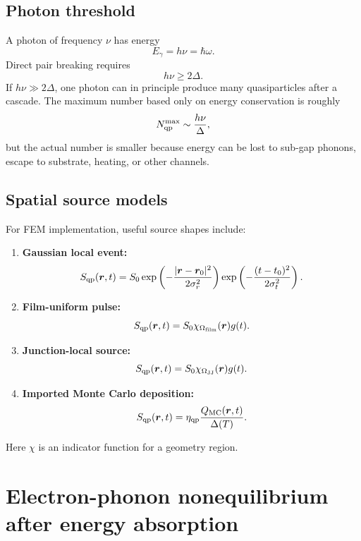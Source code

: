 \documentclass[11pt]{article}
\newcommand{\br}{{\bm{r}}}
\newcommand{\JJvol}{\Omega_{\mathrm{JJ}}}
\newcommand{\film}{\Omega_{\mathrm{film}}}
\begin{document}
\subsection{Photon threshold}
A photon of frequency $\nu$ has energy
\begin{equation}
E_\gamma=h\nu=\hbar\omega.
\end{equation}
Direct pair breaking requires
\begin{equation}
 h\nu\ge2\Delta.
\end{equation}
If $h\nu\gg2\Delta$, one photon can in principle produce many quasiparticles after a cascade. The maximum number based only on energy conservation is roughly
\begin{equation}
 N_{\mathrm{qp}}^{\max}\sim\frac{h\nu}{\Delta},
\end{equation}
but the actual number is smaller because energy can be lost to sub-gap phonons, escape to substrate, heating, or other channels.

\subsection{Spatial source models}
For FEM implementation, useful source shapes include:
\begin{enumerate}[leftmargin=1.6em]
    \item \textbf{Gaussian local event:}
    \begin{equation}
    S_{\qp}(\br,t)=S_0\exp\left(-\frac{|\br-\br_0|^2}{2\sigma_r^2}\right)
    \exp\left(-\frac{(t-t_0)^2}{2\sigma_t^2}\right).
    \end{equation}
    \item \textbf{Film-uniform pulse:}
    \begin{equation}
    S_{\qp}(\br,t)=S_0\chi_{\film}(\br)g(t).
    \end{equation}
    \item \textbf{Junction-local source:}
    \begin{equation}
    S_{\qp}(\br,t)=S_0\chi_{\JJvol}(\br)g(t).
    \end{equation}
    \item \textbf{Imported Monte Carlo deposition:}
    \begin{equation}
    S_{\qp}(\br,t)=\eta_{\qp}\frac{Q_{\mathrm{MC}}(\br,t)}{\Delta(T)}.
    \end{equation}
\end{enumerate}
Here $\chi$ is an indicator function for a geometry region.

\section{Electron-phonon nonequilibrium after energy absorption}
\end{document}
